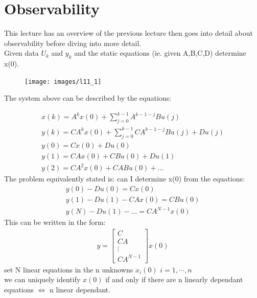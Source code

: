 \documentclass[a4paper,11pt]{article}
\begin{document}
		\section{Observability}
		This lecture has an overview of the previous lecture then goes into detail about observability before diving into more detail.\\
		Given data ${U_k}$ and ${y_k}$ and the static equations (ie. given A,B,C,D) determine x(0).\\
			\begin{figure}[htp]
		\centering
		\texttt{[image: images/l11\_1]}
		\end{figure}
		The system above can be described by the equations:


		\begin{gather}
			x(k)=A^kx(0)+\sum^{k-1}_{j=0}A^{k-1-j}Bu(j)\\	
						y(k)=CA^kx(0)+\sum^{k-1}_{j=0}CA^{k-1-j}Bu(j)+Du(j)\\
					y(0)=Cx(0)+Du(0)\\
					y(1)=CAx(0)+CBu(0)+Du(1)\\
					y(2)=CA^2x(0)+CABu(0)+...
		\end{gather}
		The problem equivalently stated is: can I determine x(0) from the equations:
		 \begin{gather}
					y(0)-Du(0) =Cx(0)\\
					y(1)-Du(1)-CAx(0)=CBu(0)\\
					y(N)-Du(1)-... =CA^{N-1}x(0)
		\end{gather}
		This can be written in the form: 
		\begin{gather}
			y=
			\begin{bmatrix}
				C\\
				CA\\
				\vdots\\
				CA^{N-1}
			\end{bmatrix}x(0)
		\end{gather}
		set N linear equations in the n unknowns $x_i(0)$ $i=1,\cdots,n$\\
		we can uniquely identify $x(0)$ if and only if there are n linearly dependant equations  $\Leftrightarrow$ n linear dependant.\\
\end{document}
